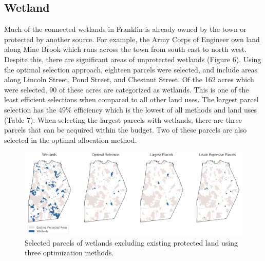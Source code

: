 \documentclass[12pt, stu, floatsintext,table]{apa7}
\begin{document}
\subsection{Wetland}
Much of the connected wetlands in Franklin is already owned by the town or protected by another source. For example, the Army Corps of Engineer own land along Mine Brook which runs across the town from south east to north west. Despite this, there are significant areas of unprotected wetlands (Figure 6). Using the optimal selection approach, eighteen parcels were selected, and include areas along Lincoln Street, Pond Street, and Chestnut Street. Of the 162 acres which were selected, 90 of these acres are categorized as wetlands. This is one of the least efficient selections when compared to all other land uses. The largest parcel selection has the 49\% efficiency which is the lowest of all methods and land uses (Table 7). When selecting the largest parcels with wetlands, there are three parcels that can be acquired within the budget. Two of these parcels are also selected in the optimal allocation method. 
\begin{figure}[hbtp]
    \centering
    \includegraphics[width = \textwidth]{figures/n_61wetland.png}
    \caption{Selected parcels of wetlands excluding existing protected land using three optimization methods.}
\end{figure}
\end{document}

